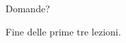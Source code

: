 \documentclass{beamer}
\begin{document}



\begin{frame}
{\centerline{Domande?}}
\vspace{1cm}
\begin{center}
    \LARGE{Fine delle prime tre lezioni.}
\end{center}

\end{frame}
\end{document}

